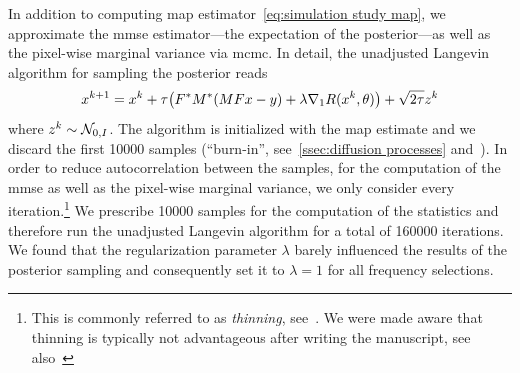 In addition to computing \gls{map} estimator~\cref{eq:simulation study map}, we approximate the \gls{mmse} estimator---the expectation of the posterior---as well as the pixel-wise marginal variance via \gls{mcmc}.
In detail, the unadjusted Langevin algorithm for sampling the posterior reads
\begin{equation}
	x^{k+\num{1}} = x^k + \tau \bigl(F^{\ast}M^{\ast}(MF x - y) + \lambda \nabla_{\num{1}} R(x^{k}, \theta)\bigr) + \sqrt{\num{2}\tau} z^k
\end{equation}
where \( z^k \sim \mathcal{N}_{\num{0}, I} \).
The algorithm is initialized with the \gls{map} estimate and we discard the first \num{10000} samples (\enquote{burn-in}, see~\cref{ssec:diffusion processes} and~\cite[section 1.11]{brooks_handbook_2011}).
In order to reduce autocorrelation between the samples, for the computation of the \gls{mmse} as well as the pixel-wise marginal variance, we only consider every  iteration.\footnote{%
	This is commonly referred to as \emph{thinning}, see~\cite{Link2011}.
	We were made aware that thinning is typically not advantageous after writing the manuscript, see also~\cite[remark 4.1 and appendix D]{Narnhofer2024}
}
We prescribe \num{10000} samples for the computation of the statistics and therefore run the unadjusted Langevin algorithm for a total of \num{160000} iterations.
We found that the regularization parameter \( \lambda \) barely influenced the results of the posterior sampling and consequently set it to \( \lambda = \num{1} \) for all frequency selections.
